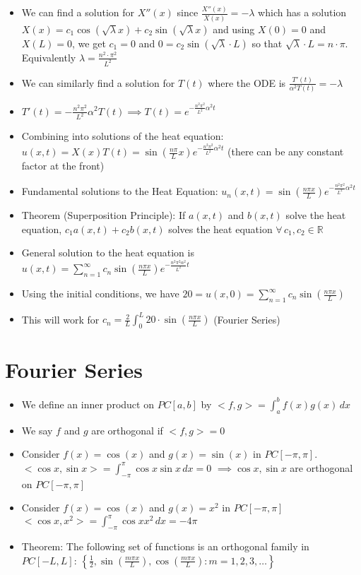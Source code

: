 \documentclass[12pt]{article}
\begin{document}
\begin{itemize}
\begin{itemize}
        \item We can find a solution for $X''(x)$ since $\frac{X''(x)}{X(x)} = - \lambda$ which has a solution $X(x) = c_1 \cos (\sqrt{\lambda} x) + c_2 \sin (\sqrt{\lambda} x)$ and using $X(0) = 0$ and $X(L) = 0$, we get $c_1 =0$ and $0 = c_2 \sin (\sqrt{\lambda} \cdot L)$ so that $\sqrt{\lambda} \cdot L = n \cdot \pi$. Equivalently $\lambda = \frac{n^2 \cdot \pi^2}{L^2}$
        \item We can similarly find a solution for $T(t)$ where the ODE is $\frac{T'(t)}{\alpha^2 T(t)} = - \lambda$
        \item $T'(t) = - \frac{n^2 \pi^2}{L^2} \alpha^2 T(t) \implies T(t) = e^{- \frac{n^2 \pi^2}{L^2} \alpha^2 t}$
        \item Combining into solutions of the heat equation: $u(x,t) = X(x) T(t) = \sin (\frac{n \pi}{L} x) e^{- \frac{n^2 \pi^2}{L^2} \alpha^2 t}$ (there can be any constant factor at the front)
        \item Fundamental solutions to the Heat Equation: $u_n (x,t) = \sin (\frac{n \pi x}{L}) e^{- \frac{n^2 \pi^2}{L^2} \alpha^2 t}$
        \item Theorem (Superposition Principle): If $a(x,t)$ and $b(x,t)$ solve the heat equation, $c_1 a(x,t) + c_2 b(x,t)$ solves the heat equation $\forall \, c_1, c_2 \in \mathbb{R}$
        \item General solution to the heat equation is $u(x,t) = \sum_{n=1}^{\infty} c_n \sin (\frac{n \pi x}{L}) e^{- \frac{n^2 \pi ^2 \alpha^2}{L^2} t}$
        \item Using the initial conditions, we have $20 = u(x,0) = \sum_{n=1}^{\infty} c_n \sin (\frac{n \pi x}{L})$
        \item This will work for $c_n = \frac{2}{L} \int_{0}^{L} 20 \cdot \sin (\frac{n \pi x}{L})$ (Fourier Series)
    \end{itemize}
\end{itemize}

\section{Fourier Series}

\begin{itemize}
    \item We define an inner product on $PC[a, b]$ by $<f, g> = \int_a^{b} f(x)g(x) \, dx$
    \item We say $f$ and $g$ are orthogonal if $<f,g> = 0$
    \item Consider $f(x)  =\cos(x)$ and $g(x) = \sin (x)$ in $PC[- \pi, \pi]$. $<\cos x, \sin x> = \int_{- \pi }^{\pi} \cos x \sin x \, dx = 0$ $\implies \cos x, \sin x$ are orthogonal on $PC [- \pi, \pi]$
    \item Consider $f(x) = \cos (x)$ and $g(x) = x^2$ in $PC[- \pi, \pi]$ $< \cos x, x^2 > = \int_{- \pi}^{\pi} \cos x x^2 \, dx = -4 \pi$
    \item Theorem: The following set of functions is an orthogonal family in $PC[-L, L]$: $\left\{ \frac{1}{2}, \sin (\frac{m \pi x}{L}), \cos (\frac{m \pi x}{L}): m = 1, 2, 3, \dots \right\}$
\end{itemize}
\end{document}
